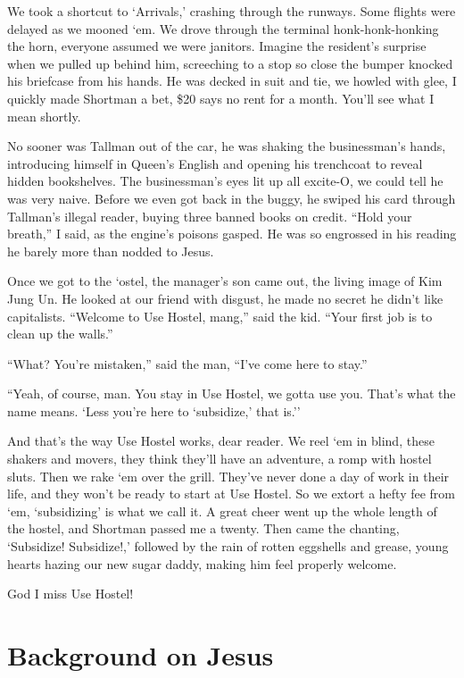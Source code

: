 \documentclass[oneside]{book}
\begin{document}
We took a shortcut to `Arrivals,' crashing through the runways.  Some
flights were delayed as we mooned `em.  We drove through the terminal
honk-honk-honking the horn, everyone assumed we were janitors.  Imagine
the resident's surprise when we pulled up behind him, screeching to a
stop so close the bumper knocked his briefcase from his hands.  He was
decked in suit and tie, we howled with glee, I quickly made Shortman a
bet, \$20 says no rent for a month.  You'll see what I mean shortly.

No sooner was Tallman out of the car, he was shaking the businessman's
hands, introducing himself in Queen's English and opening his trenchcoat
to reveal hidden bookshelves.  The businessman's eyes lit up all excite-O,
we could tell he was very naive.  Before we even got back
in the buggy, he swiped his card through Tallman's illegal reader, buying three banned
books on credit.  ``Hold your breath,'' I said, as the engine's poisons gasped.
He was so engrossed in his reading he barely more than nodded to Jesus.

Once we got to the `ostel, the manager's son came out, the living image of
Kim Jung Un.  He looked at our friend with disgust, he made no secret he didn't
like capitalists.  ``Welcome to Use Hostel, mang,'' said the kid.  ``Your first
job is to clean up the walls.''

``What?  You're mistaken,'' said the man, ``I've come here to stay.''

``Yeah, of course, man.  You stay in Use Hostel, we gotta use you.  That's what
the name means.  `Less you're here to `subsidize,' that is.''

And that's the way Use Hostel works, dear reader.  We reel `em in blind, these
shakers and movers, they think they'll have an adventure, a romp with hostel
sluts.  Then we rake `em over the grill.  They've never done a day of work in
their life, and they won't be ready to start at Use Hostel.  So we extort a hefty
fee from `em, `subsidizing' is what we call it.  A great cheer went up the whole
length of the hostel, and Shortman passed me a twenty.  Then came the chanting,
`Subsidize! Subsidize!,' followed by the rain of rotten eggshells and grease,
young hearts hazing our new sugar daddy, making him feel properly welcome.

God I miss Use Hostel!


\chapter{Background on Jesus}
\end{document}
